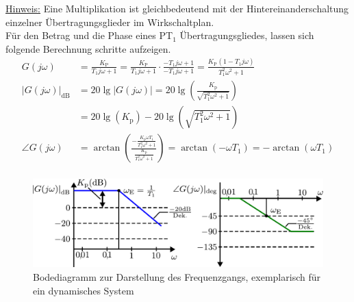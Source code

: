 \underline{Hinweis:} Eine Multiplikation ist gleichbedeutend mit der Hintereinanderschaltung einzelner Übertragungsglieder im Wirkschaltplan.\\
%
%
Für den Betrag und die Phase eines PT$_{1}$ Übertragungsgliedes, lassen sich folgende Berechnung schritte aufzeigen.
%
\begin{equation*}
\begin{aligned}
%
G(j\omega)&=\frac{K_{\text{P}}}{T_{1}j\omega+1}=\frac{K_{\text{P}}}{T_{1}j\omega+1}\cdot\frac{-T_{1}j\omega+1}{-T_{1}j\omega+1}=\frac{K_{\text{P}}\left(1-T_{1}j\omega\right)}{T^{2}_{1}\omega^{2}+1}\\
%
|G(j\omega)|_{\text{dB}}&=20\lg|G(j\omega)|=20\lg\left(\frac{K_{\text{p}}}{\sqrt{T^{2}_{1}\omega^{2}+1}}\right)\\
%
&=20\lg\left(K_{\text{p}}\right)-20\lg\left(\sqrt{T_{1}^{2}\omega^{2}+1}\right)\\
%
\angle G(j\omega)&=\arctan\left(\frac{-\frac{K_{\text{p}}\omega T_{1}}{T^{2}_{1}\omega^{2}+1}}{\frac{K_{\text{p}}}{T^{2}_{1}\omega^{2}+1}}\right)=\arctan\left(-\omega T_{1}\right)=-\arctan\left(\omega T_{1}\right)\\
\end{aligned}
\end{equation*}
%
\begin{figure}[ht!]
	\centering
	\includegraphics[width=0.9\linewidth]{Abbildungen/Modellbildung/PDF/PT1gliedBode.pdf}
	\caption{Bodediagramm zur Darstellung des Frequenzgangs, exemplarisch für ein dynamisches System}
	\label{fig:bodediagramm}
\end{figure} 
